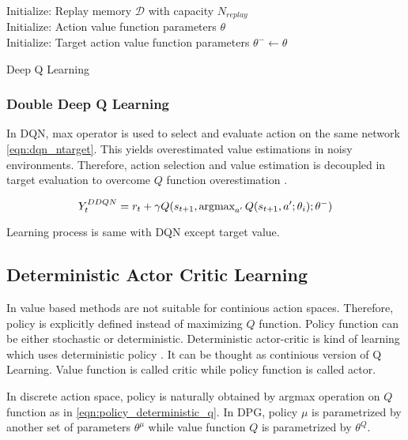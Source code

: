 \begin{algorithm}[H]
	\SetAlgoLined
	\DontPrintSemicolon %
	Initialize: Replay memory $\mathcal{D}$ with capacity $N_{replay}$ \\
	Initialize: Action value function parameters $\theta$ \\
	Initialize: Target action value function parameters $\theta^- \leftarrow \theta$ \\
	
	\caption{Deep Q Learning}
\end{algorithm}

\subsubsection{Double Deep Q Learning}

In DQN, max operator is used to select and evaluate action on the same network \ref{eqn:dqn_ntarget}. This yields overestimated value estimations in noisy environments. Therefore, action selection and value estimation is decoupled in target evaluation to overcome $Q$ function overestimation \cite{van_hasselt_deep_2015}.

\begin{equation}
\label{eqn:ddqn_ntarget}
Y_t^{DDQN} = r_t + \gamma Q(s_{t+1}, \operatorname{\textup{argmax}}_{a'} Q(s_{t+1}, a'; \theta_i );\theta^-)
\end{equation}

Learning process is same with DQN except target value.

\subsection{Deterministic Actor Critic Learning}
In value based methods are not suitable for continious action spaces. Therefore, policy is explicitly defined instead of maximizing $Q$ function. Policy function can be either stochastic or deterministic.  Deterministic actor-critic is kind of learning which uses deterministic policy \cite{silver_deterministic_2014}. It can be thought as continious version of Q Learning. Value function is called critic while policy function is called actor.

In discrete action space, policy is naturally obtained by argmax operation on $Q$ function as in \ref{eqn:policy_deterministic_q}. In DPG, policy $\mu$ is parametrized by another set of parameters $\theta^\mu$ while value function $Q$ is parametrized by $\theta^Q$. 

